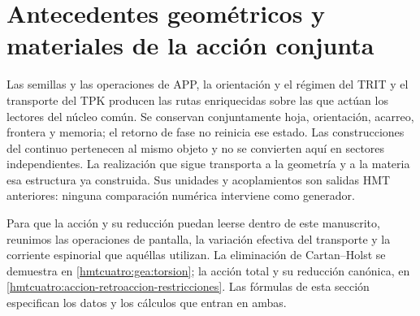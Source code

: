 \section{Antecedentes geométricos y materiales de la acción conjunta}
\label{hmtcuatro:ant:seccion}

Las semillas y las operaciones de APP, la orientación y el régimen
del TRIT y el transporte del TPK producen las rutas enriquecidas sobre
las que actúan los lectores del núcleo común. Se conservan conjuntamente
hoja, orientación, acarreo, frontera y memoria; el retorno de fase no
reinicia ese estado. Las construcciones del continuo pertenecen al mismo
objeto y no se convierten aquí en sectores independientes. La
realización que sigue transporta a la geometría y a la materia esa
estructura ya construida. Sus unidades y acoplamientos son salidas
HMT anteriores: ninguna comparación numérica interviene como generador.

Para que la acción y su reducción puedan leerse dentro de este
manuscrito, reunimos las operaciones de pantalla, la variación efectiva
del transporte y la corriente espinorial que aquéllas utilizan. La
eliminación de Cartan--Holst se demuestra en
\ref{hmtcuatro:gea:torsion}; la acción total y su reducción canónica,
en \ref{hmtcuatro:accion-retroaccion-restricciones}. Las fórmulas de
esta sección especifican los datos y los cálculos que entran en ambas.

